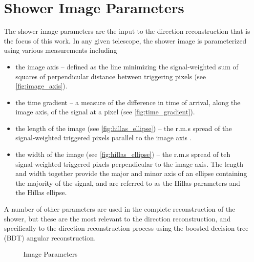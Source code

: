 \documentclass[main.tex]{subfiles}
\begin{document}
\section{Shower Image Parameters}
\label{shower-img-params}
The shower image parameters are the input to the direction reconstruction that is the focus of this work. In any given telescope, the shower image is parameterized using various measurements including
\begin{itemize}
\item the image axis -- defined as the line minimizing the signal-weighted sum of squares of perpendicular distance between triggering pixels (see \ref{fig:image_axis}).
\item the time gradient -- a measure of the difference in time of arrival, along the image axis, of the signal at a pixel (see \ref{fig:time_gradient}).
\item the length of the image (see \ref{fig:hillas_ellipse}) -- the r.m.s spread of the signal-weighted triggered pixels parallel to the image axis \cite{Hillas:1985}.
\item the width of the image (see \ref{fig:hillas_ellipse}) -- the r.m.s spread of teh signal-weighted triggered pixels perpendicular to the image axis. The length and width together provide the major and minor axis of an ellipse containing the majority of the signal, and are referred to as the Hillas parameters and the Hillas ellipse.
\end{itemize}
A number of other parameters are used in the complete reconstruction of the shower, but these are the most relevant to the direction reconstruction, and specifically to the direction reconstruction process using the boosted decision tree (BDT) angular reconstruction.
\begin{figure}[htbp]
  \centering
  \caption[Image parameters]{Image Parameters}
  \label{fig:img_params}
\end{figure}
\end{document}
